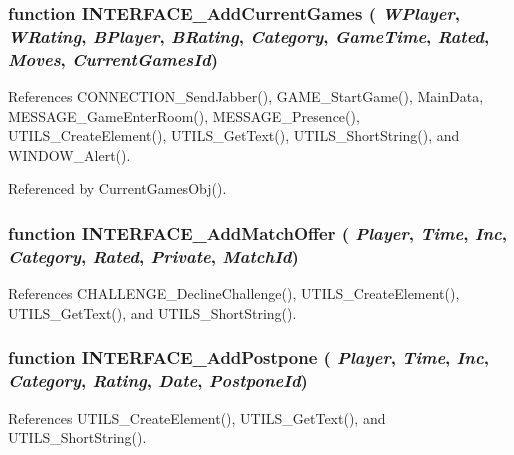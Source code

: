 \subsubsection[INTERFACE\_\-AddCurrentGames]{\setlength{\rightskip}{0pt plus 5cm}function INTERFACE\_\-AddCurrentGames ( {\em WPlayer}, \/   {\em WRating}, \/   {\em BPlayer}, \/   {\em BRating}, \/   {\em Category}, \/   {\em GameTime}, \/   {\em Rated}, \/   {\em Moves}, \/   {\em CurrentGamesId})}\label{interface_2gamecenter_8js_bb4372454a59e84d8da29f567e0e5c5d}




References CONNECTION\_\-SendJabber(), GAME\_\-StartGame(), MainData, MESSAGE\_\-GameEnterRoom(), MESSAGE\_\-Presence(), UTILS\_\-CreateElement(), UTILS\_\-GetText(), UTILS\_\-ShortString(), and WINDOW\_\-Alert().

Referenced by CurrentGamesObj().
\subsubsection[INTERFACE\_\-AddMatchOffer]{\setlength{\rightskip}{0pt plus 5cm}function INTERFACE\_\-AddMatchOffer ( {\em Player}, \/   {\em Time}, \/   {\em Inc}, \/   {\em Category}, \/   {\em Rated}, \/   {\em Private}, \/   {\em MatchId})}\label{interface_2gamecenter_8js_1dba5bfa61fbb54f93e0ee49b5828223}




References CHALLENGE\_\-DeclineChallenge(), UTILS\_\-CreateElement(), UTILS\_\-GetText(), and UTILS\_\-ShortString().
\subsubsection[INTERFACE\_\-AddPostpone]{\setlength{\rightskip}{0pt plus 5cm}function INTERFACE\_\-AddPostpone ( {\em Player}, \/   {\em Time}, \/   {\em Inc}, \/   {\em Category}, \/   {\em Rating}, \/   {\em Date}, \/   {\em PostponeId})}\label{interface_2gamecenter_8js_d52ba3c0ac62535bd7f55cfeac8a5446}




References UTILS\_\-CreateElement(), UTILS\_\-GetText(), and UTILS\_\-ShortString().

